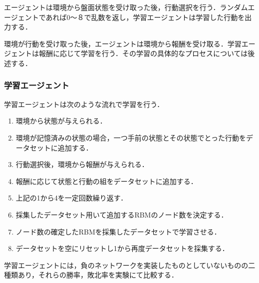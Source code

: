 エージェントは環境から盤面状態を受け取った後，行動選択を行う．ランダムエージェントであれば0〜８で乱数を返し，学習エージェントは学習した行動を出力する．

環境が行動を受け取った後，エージェントは環境から報酬を受け取る．学習エージェントは報酬に応じて学習を行う．その学習の具体的なプロセスについては後述する．

\subsubsection{学習エージェント}
学習エージェントは次のような流れで学習を行う．


\begin{enumerate}
  \item 環境から状態が与えられる．
  \item 環境が記憶済みの状態の場合，一つ手前の状態とその状態でとった行動をデータセットに追加する．
  \item 行動選択後，環境から報酬が与えられる．
  \item 報酬に応じて状態と行動の組をデータセットに追加する．
  \item 上記の1から4を一定回数繰り返す．
  \item 採集したデータセット用いて追加するRBMのノード数を決定する．
  \item ノード数の確定したRBMを採集したデータセットで学習させる．
  \item データセットを空にリセットし1から再度データセットを採集する．
\end{enumerate}

学習エージェントには，負のネットワークを実装したものとしていないものの二種類あり，それらの勝率，敗北率を実験にて比較する．



